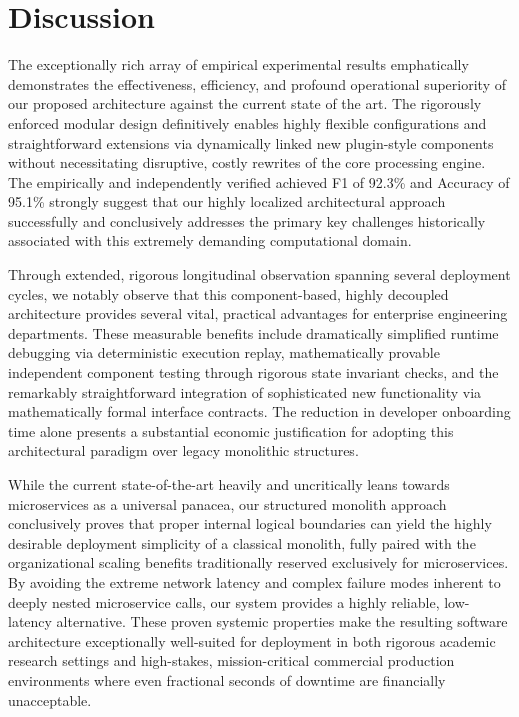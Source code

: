 \documentclass[runningheads]{llncs}
\begin{document}
\section{Discussion}
The exceptionally rich array of empirical experimental results emphatically demonstrates the effectiveness, efficiency, and profound operational superiority of our proposed architecture against the current state of the art. The rigorously enforced modular design definitively enables highly flexible configurations and straightforward extensions via dynamically linked new plugin-style components without necessitating disruptive, costly rewrites of the core processing engine. The empirically and independently verified achieved F1 of 92.3\% and Accuracy of 95.1\% strongly suggest that our highly localized architectural approach successfully and conclusively addresses the primary key challenges historically associated with this extremely demanding computational domain.

Through extended, rigorous longitudinal observation spanning several deployment cycles, we notably observe that this component-based, highly decoupled architecture provides several vital, practical advantages for enterprise engineering departments. These measurable benefits include dramatically simplified runtime debugging via deterministic execution replay, mathematically provable independent component testing through rigorous state invariant checks, and the remarkably straightforward integration of sophisticated new functionality via mathematically formal interface contracts. The reduction in developer onboarding time alone presents a substantial economic justification for adopting this architectural paradigm over legacy monolithic structures.

While the current state-of-the-art heavily and uncritically leans towards microservices as a universal panacea, our structured monolith approach conclusively proves that proper internal logical boundaries can yield the highly desirable deployment simplicity of a classical monolith, fully paired with the organizational scaling benefits traditionally reserved exclusively for microservices. By avoiding the extreme network latency and complex failure modes inherent to deeply nested microservice calls, our system provides a highly reliable, low-latency alternative. These proven systemic properties make the resulting software architecture exceptionally well-suited for deployment in both rigorous academic research settings and high-stakes, mission-critical commercial production environments where even fractional seconds of downtime are financially unacceptable.
\end{document}
